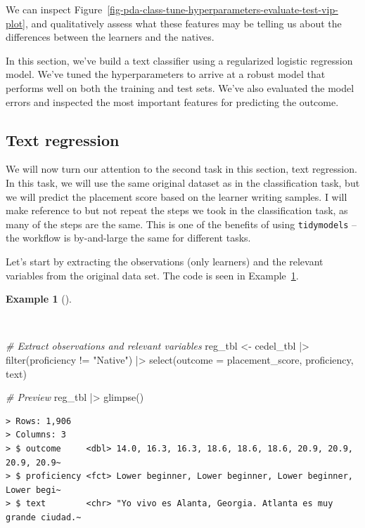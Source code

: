 \documentclass[
  letterpaper,
]{latex/krantz}
\newenvironment{Shaded}{\begin{snugshade}}{\end{snugshade}}
\newcommand{\AttributeTok}[1]{\textcolor[rgb]{0.00,0.00,0.00}{#1}}
\newcommand{\CommentTok}[1]{\textcolor[rgb]{0.00,0.00,0.00}{\textit{#1}}}
\newcommand{\FunctionTok}[1]{\textcolor[rgb]{0.00,0.00,0.00}{#1}}
\newcommand{\NormalTok}[1]{\textcolor[rgb]{0.00,0.00,0.00}{#1}}
\newcommand{\OtherTok}[1]{\textcolor[rgb]{0.00,0.00,0.00}{#1}}
\newcommand{\SpecialCharTok}[1]{\textcolor[rgb]{0.00,0.00,0.00}{#1}}
\newcommand{\StringTok}[1]{\textcolor[rgb]{0.00,0.00,0.00}{#1}}
\theoremstyle{definition}
\newtheorem{example}{Example}[chapter]
\theoremstyle{remark}
\begin{document}
We can inspect
Figure~\ref{fig-pda-class-tune-hyperparameters-evaluate-test-vip-plot},
and qualitatively assess what these features may be telling us about the
differences between the learners and the natives.

In this section, we've build a text classifier using a regularized
logistic regression model. We've tuned the hyperparameters to arrive at
a robust model that performs well on both the training and test sets.
We've also evaluated the model errors and inspected the most important
features for predicting the outcome.

\subsection{Text regression}\label{sec-pda-text-regression}

We will now turn our attention to the second task in this section, text
regression. In this task, we will use the same original dataset as in
the classification task, but we will predict the placement score based
on the learner writing samples. I will make reference to but not repeat
the steps we took in the classification task, as many of the steps are
the same. This is one of the benefits of using \texttt{tidymodels} --the
workflow is by-and-large the same for different tasks.

Let's start by extracting the observations (only learners) and the
relevant variables from the original data set. The code is seen in
Example~\ref{exm-pda-reg-data}.

\begin{example}[]\protect\hypertarget{exm-pda-reg-data}{}\label{exm-pda-reg-data}

~

\begin{Shaded}
\begin{Highlighting}[]
\CommentTok{\# Extract observations and relevant variables}
\NormalTok{reg\_tbl }\OtherTok{\textless{}{-}}
\NormalTok{  cedel\_tbl }\SpecialCharTok{|\textgreater{}}
  \FunctionTok{filter}\NormalTok{(proficiency }\SpecialCharTok{!=} \StringTok{"Native"}\NormalTok{) }\SpecialCharTok{|\textgreater{}}
  \FunctionTok{select}\NormalTok{(}\AttributeTok{outcome =}\NormalTok{ placement\_score, proficiency, text)}

\CommentTok{\# Preview}
\NormalTok{reg\_tbl }\SpecialCharTok{|\textgreater{}} \FunctionTok{glimpse}\NormalTok{()}
\end{Highlighting}
\end{Shaded}

\begin{verbatim}
> Rows: 1,906
> Columns: 3
> $ outcome     <dbl> 14.0, 16.3, 16.3, 18.6, 18.6, 18.6, 20.9, 20.9, 20.9, 20.9~
> $ proficiency <fct> Lower beginner, Lower beginner, Lower beginner, Lower begi~
> $ text        <chr> "Yo vivo es Alanta, Georgia. Atlanta es muy grande ciudad.~
\end{verbatim}

\end{example}
\end{document}
